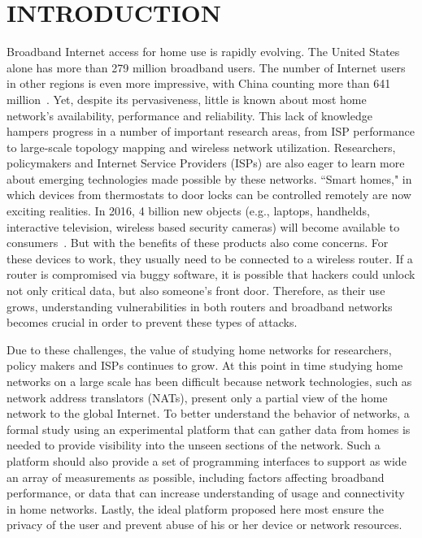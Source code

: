 \chapter{INTRODUCTION}
\label{sec.introduction}
Broadband Internet access for home use is rapidly evolving. The United States
alone has more than 279 million broadband users. The number of Internet 
users in other regions is even more impressive, with China counting more 
than 641 million~\cite{asia}. Yet, despite its pervasiveness, little is 
known about most home network's availability, performance and reliability. This lack of knowledge hampers progress in a number of important research 
areas, from ISP performance to large-scale
topology mapping and wireless network utilization. Researchers, policymakers 
and Internet Service Providers (ISPs) are also eager to learn more about 
emerging technologies made possible by these networks. ``Smart homes," in 
which devices from thermostats to door locks can be controlled remotely are
 now exciting realities. In 2016, 4 billion new objects (e.g., laptops, 
handhelds, interactive television, wireless based security cameras) will 
become available to consumers~\cite{gartner}. But with the benefits of these 
products also come concerns. For these devices to work, they usually need to 
be connected to a wireless router. If a router is compromised via buggy 
software, it is possible that hackers could unlock not only critical data, 
but also someone's front door. Therefore, as their use grows, understanding 
vulnerabilities in both routers and broadband networks becomes crucial in 
order to prevent these types of attacks.

Due to these challenges, the value of studying home networks for researchers, 
policy makers and ISPs continues to grow. At this point in time studying 
home networks on a large scale has been difficult because network 
technologies, such as network address translators (NATs), present only a 
partial view of the home network to the global Internet. To better understand 
the behavior of networks, a formal study using an experimental platform that 
can gather data from homes is needed to provide visibility into the 
unseen sections of the network. Such a platform should also provide a set of 
programming interfaces to support as wide an array of measurements as 
possible, including factors affecting broadband performance, or data that 
can increase understanding of usage and connectivity in home networks.
Lastly, the ideal platform proposed here most ensure the privacy of the 
user and prevent abuse of his or her device or network resources.

